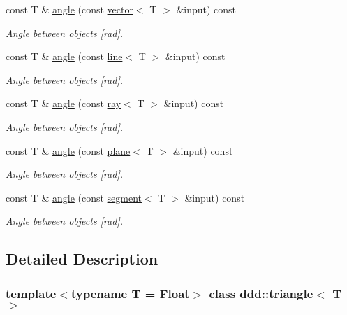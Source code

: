 \begin{DoxyCompactItemize}
const T \& \hyperlink{classddd_1_1triangle_a4ef530c1ffcdafb0a0dfeb74c02dc890}{angle} (const \hyperlink{classddd_1_1vector}{vector}$<$ T $>$ \&input) const
\begin{DoxyCompactList}\small\item\em Angle between objects \mbox{[}rad\mbox{]}. \end{DoxyCompactList}\item 
const T \& \hyperlink{classddd_1_1triangle_a98946234d7e985c3a22f74467e7c4467}{angle} (const \hyperlink{classddd_1_1line}{line}$<$ T $>$ \&input) const
\begin{DoxyCompactList}\small\item\em Angle between objects \mbox{[}rad\mbox{]}. \end{DoxyCompactList}\item 
const T \& \hyperlink{classddd_1_1triangle_a47d6182945cca395be1b9f6f387694b9}{angle} (const \hyperlink{classddd_1_1ray}{ray}$<$ T $>$ \&input) const
\begin{DoxyCompactList}\small\item\em Angle between objects \mbox{[}rad\mbox{]}. \end{DoxyCompactList}\item 
const T \& \hyperlink{classddd_1_1triangle_a0500bf1ca10c82a24b6d61ade86b1f19}{angle} (const \hyperlink{classddd_1_1plane}{plane}$<$ T $>$ \&input) const
\begin{DoxyCompactList}\small\item\em Angle between objects \mbox{[}rad\mbox{]}. \end{DoxyCompactList}\item 
const T \& \hyperlink{classddd_1_1triangle_afcb7c775aada1ae8b396742d0f36ac51}{angle} (const \hyperlink{classddd_1_1segment}{segment}$<$ T $>$ \&input) const
\begin{DoxyCompactList}\small\item\em Angle between objects \mbox{[}rad\mbox{]}. \end{DoxyCompactList}\end{DoxyCompactItemize}


\subsection{Detailed Description}
\subsubsection*{template$<$typename T = Float$>$\newline
class ddd\+::triangle$<$ T $>$}

